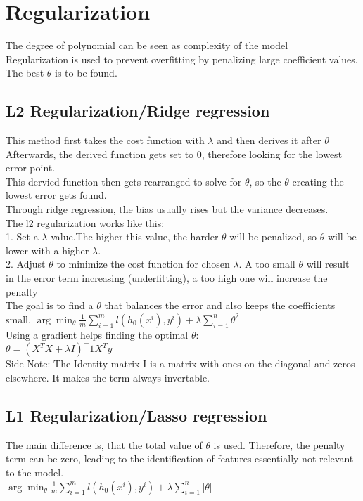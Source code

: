 \documentclass{article}
\begin{document}
\section{Regularization}
The degree of polynomial can be seen as complexity of the model\\
Regularization is used to prevent overfitting by penalizing large coefficient values. \\ 
The best $\theta$ is to be found.
\subsection{L2 Regularization/Ridge regression}
This method first takes the cost function with $\lambda $ and then derives it after $\theta$ \\
Afterwards, the derived function gets set to 0, therefore looking for the lowest error point. \\ 
This dervied function then gets rearranged to solve for $\theta $, so the $\theta $ creating the lowest error gets found.\\
Through ridge regression, the bias usually rises but the variance decreases.\\
The l2 regularization works like this: \\
1. Set a $\lambda $ value.The higher this value, the harder $\theta $ will be penalized, so $\theta $ will be lower with a higher $\lambda $. \\ 
2. Adjust $\theta $ to minimize the cost function for chosen $\lambda$. A too small $\theta$ will result in the error term increasing (underfitting), a too high one will increase the penalty \\
The goal is to find a $\theta$ that balances the error and also keeps the coefficients small.
$\arg\min_{\theta} \frac{1}{m} \sum_{i = 1}^{m} l(h_0(x^i),y^i)+\lambda \sum_{i = 1}^{n}\theta^2$ \\
Using a gradient helps finding the optimal $\theta$: \\
$\theta = (X^TX+\lambda I)^-1X^Ty$\\
Side Note: The Identity matrix I is a matrix with ones on the diagonal and zeros elsewhere. It makes the term always invertable. \\
\subsection{L1 Regularization/Lasso regression}
The main difference is, that the total value of $\theta$ is used. Therefore, the penalty term can be zero, leading to the identification of features essentially not relevant to the model.
\\$\arg\min_{\theta} \frac{1}{m} \sum_{i = 1}^{m} l(h_0(x^i),y^i)+\lambda \sum_{i = 1}^{n} |  \theta |$ \\
\end{document}
